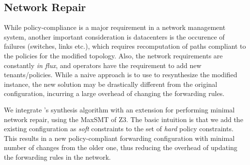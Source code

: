 \subsection{Network Repair}
While policy-compliance is a major requirement in a network management system,
another important consideration is datacenters is the occurence of failures (switches, links etc.),
which requires recomputation of paths compliant to the policies for the modified topology. 
Also, the network requirements are constantly \emph{in flux}, and operators have the requirement to 
add new tenants/policies. While a naive approach is to use \name to resynthesize the modified instance,
the new solution may be drastically different from the original configuration, incurring a
large overhead of changing the forwarding rules.

We integrate \name's synthesis algorithm with an extension for performing
minimal network repair, using the MaxSMT of Z3. The basic intuition is that
we add the existing configuration as \emph{soft} constraints to the set of \emph{hard} 
policy constraints. This results in a new policy-compliant forwarding 
configuration with minimal 
number of changes from the older one, thus reducing the overhead of
updating the forwarding rules in the network. 





 